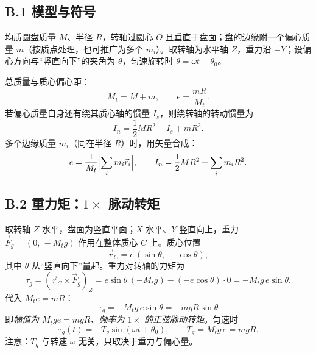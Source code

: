 
\subsection*{B.1 模型与符号}

均质圆盘质量 $M$、半径 $R$，转轴过圆心 $O$ 且垂直于盘面；盘的边缘附一个偏心质量 $m$（按质点处理，也可推广为多个 $m_i$）。取转轴为水平轴 $Z$，重力沿 $-Y$；设偏心方向与“竖直向下”的夹角为 $\theta$，匀速旋转时 $\theta=\omega t+\theta_0$。

总质量与质心偏心距：
\begin{equation}
M_t=M+m,\qquad
e=\frac{mR}{M_t}.
\label{eq:unb-e}
\end{equation}
若偏心质量自身还有绕其质心轴的惯量 $I_s$，则绕转轴的转动惯量为
\begin{equation}
I_n=\frac12MR^2+I_s+mR^2 .
\label{eq:unb-In}
\end{equation}
多个边缘质量 $m_i$（同在半径 $R$）时，用矢量合成：
\begin{equation}
e=\frac{1}{M_t}\Bigl|\sum_i m_i\vec r_i\Bigr|,\qquad
I_n=\frac12MR^2+\sum_i m_iR^2 .
\end{equation}

\subsection*{B.2 重力矩：$1\times$ 脉动转矩}

取转轴 $Z$ 水平，盘面为竖直平面；$X$ 水平、$Y$ 竖直向上，重力 $\vec F_g=(0,\,-M_t g)$ 作用在整体质心 $C$ 上。质心位置
\begin{equation}
\vec r_C=e\,(\sin\theta,\,-\cos\theta),
\end{equation}
其中 $\theta$ 从“竖直向下”量起。重力对转轴的力矩为
\begin{equation}
\tau_g=(\vec r_C\times\vec F_g)_Z
=e\sin\theta\,(-M_t g)-(-e\cos\theta)\cdot 0
=-M_t g\,e\sin\theta .
\label{eq:unb-taug}
\end{equation}
代入 $M_te=mR$：
\begin{equation}
\boxed{\;\tau_g=-M_t g\,e\sin\theta=-m g R\sin\theta\;}
\label{eq:unb-taug2}
\end{equation}
即\emph{幅值为 $M_tge=m gR$、频率为 $1\times$ 的正弦脉动转矩}。匀速时
\begin{equation}
\tau_g(t)=-T_g\sin(\omega t+\theta_0),\qquad T_g=M_t g\,e=m g R .
\label{eq:unb-Tg}
\end{equation}
注意：$T_g$ 与转速 $\omega$ \textbf{无关}，只取决于重力与偏心量。

